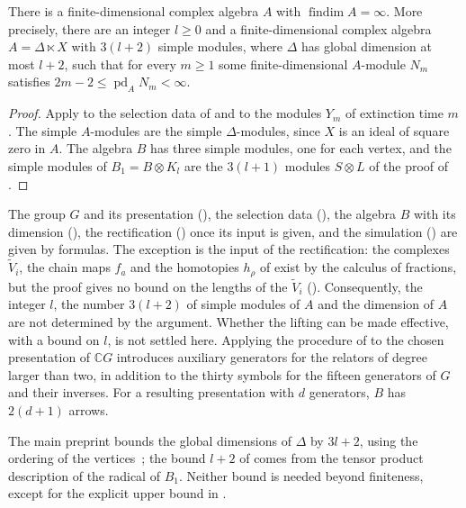 \begin{corollary}
  \label{coro:main}
  There is a finite-dimensional complex algebra $A$ with
  ${\operatorname{findim}A=\infty}$. More precisely, there are an integer
  ${l\geq0}$ and a finite-dimensional complex algebra ${A=\Delta\ltimes X}$ with
  ${3(l+2)}$ simple modules, where $\Delta$ has global dimension at most ${l+2}$,
  such that for every ${m\geq1}$ some finite-dimensional $A$-module $N_m$
  satisfies ${2m-2\leq\operatorname{pd}_AN_m<\infty}$.
\end{corollary}

\begin{proof}
  Apply  to the selection data of
   and to the modules $Y_m$ of extinction time
  $m$. The simple $A$-modules are the simple $\Delta$-modules, since $X$ is an
  ideal of square zero in $A$. The algebra $B$ has three simple modules,
  one for each vertex, and the simple modules of ${B_1=B\otimes K_l}$ are the
  ${3(l+1)}$ modules ${S\otimes L}$ of the proof of .
\end{proof}

\begin{remark}
  \label{rem:what-is-explicit}
  The group $G$ and its
  presentation (), the selection data
  (), the algebra $B$ with its
  dimension (), the rectification
  () once its input is given, and the simulation
  () are given by formulas. The exception is the input of
  the rectification: the complexes $\widetilde{V}_i$, the chain maps $f_a$ and
  the homotopies $h_\rho$ of  exist by the calculus of
  fractions, but the proof gives no bound on the lengths of the
  $\widetilde{V}_i$ (). Consequently, the integer
  $l$, the number ${3(l+2)}$ of simple modules of $A$ and the dimension of $A$
  are not determined by the argument. Whether the lifting can be made
  effective, with a bound on $l$, is not settled here. Applying the procedure of
   to the chosen presentation of $\mathbb{C}G$ introduces
  auxiliary generators for the relators of degree larger than two, in addition
  to the thirty symbols for the fifteen generators of $G$ and their inverses.
  For a resulting presentation with $d$ generators, $B$ has ${2(d+1)}$ arrows.
\end{remark}

\begin{remark}
  \label{rem:simulation-bound}
  The main preprint bounds the global dimensions of $\Delta$ by ${3l+2}$, using
  the ordering of the vertices~\cite[Proposition~5.1]{OAI26findim}; the bound ${l+2}$ of  comes from the tensor product
  description of the radical of $B_1$. Neither bound is needed beyond
  finiteness, except for the explicit upper bound in .
\end{remark}
